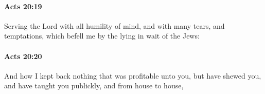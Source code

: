 		\paragraph{Acts 20:19} %
			\label{ACTS-20-19}

			Serving the Lord with all humility of mind, and with many tears, and temptations, which befell me by the lying in wait of the Jews:

			\begin{framed}
			\scriptsize
				\begin{compactdesc}
					\item[SBLG] 
				\end{compactdesc}
			\end{framed}

		\paragraph{Acts 20:20} %
			\label{ACTS-20-20}

			And how I kept back nothing that was profitable unto you, but have shewed you, and have taught you publickly, and from house to house,

